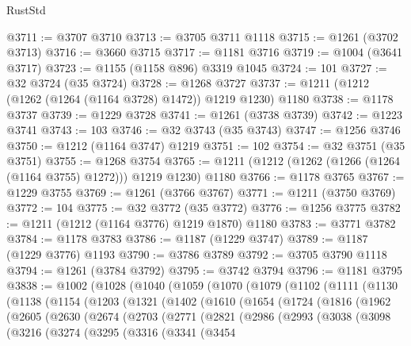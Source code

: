 \begin{lexlean}{RustStd}
\begin{coremodule}
{\begin{coremodule}
{{{{{{{{{{{{{{{{{{{{{{{{{{{{{{{{@3711 := @3707 @3710
@3713 := @3705 @3711 @1118
@3715 := @1261 (@3702 @3713)
@3716 := @3660 @3715
@3717 := @1181 @3716
@3719 := @1004 (@3641 @3717)
@3723 := @1155 (@1158 @896) @3319 @1045
@3724 := 101
@3727 := @32 @3724 (@35 @3724)
@3728 := @1268 @3727
@3737 := @1211 (@1212 (@1262 (@1264 (@1164 @3728) @1472)) @1219 @1230) @1180
@3738 := @1178 @3737
@3739 := @1229 @3728
@3741 := @1261 (@3738 @3739)
@3742 := @1223 @3741
@3743 := 103
@3746 := @32 @3743 (@35 @3743)
@3747 := @1256 @3746
@3750 := @1212 (@1164 @3747) @1219
@3751 := 102
@3754 := @32 @3751 (@35 @3751)
@3755 := @1268 @3754
@3765 := @1211 (@1212 (@1262 (@1266 (@1264 (@1164 @3755) @1272))) @1219 @1230) @1180
@3766 := @1178 @3765
@3767 := @1229 @3755
@3769 := @1261 (@3766 @3767)
@3771 := @1211 (@3750 @3769)
@3772 := 104
@3775 := @32 @3772 (@35 @3772)
@3776 := @1256 @3775
@3782 := @1211 (@1212 (@1164 @3776) @1219 @1870) @1180
@3783 := @3771 @3782
@3784 := @1178 @3783
@3786 := @1187 (@1229 @3747)
@3789 := @1187 (@1229 @3776) @1193
@3790 := @3786 @3789
@3792 := @3705 @3790 @1118
@3794 := @1261 (@3784 @3792)
@3795 := @3742 @3794
@3796 := @1181 @3795
@3838 := @1002
    (@1028
      (@1040
        (@1059
          (@1070
            (@1079
              (@1102
                (@1111
                  (@1130
                    (@1138
                      (@1154
                        (@1203
                          (@1321
                            (@1402
                              (@1610
                                (@1654
                                  (@1724
                                    (@1816
                                      (@1962
                                        (@2605
                                          (@2630
                                            (@2674
                                              (@2703
                                                (@2771
                                                  (@2821
                                                    (@2986
                                                      (@2993
                                                        (@3038
                                                          (@3098
                                                            (@3216
                                                              (@3274
                                                                (@3295
                                                                  (@3316
                                                                    (@3341
                                                                      (@3454
}}}}}}}}}}}}}}}}}}}}}}}}}}}}}}}}
\end{coremodule}}
\end{coremodule}
\end{lexlean}
